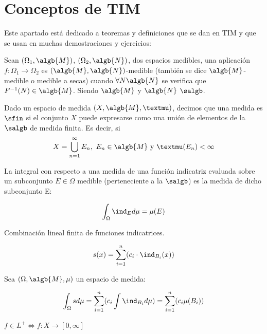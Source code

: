 \documentclass{apuntes}
\begin{document}
\section{Conceptos de TIM}
Este apartado está dedicado a teoremas y definiciones que se dan en TIM y que se usan en muchas demostraciones y ejercicios:

\begin{defn}
Sean $(\Omega_1, \algb{M})$, $(\Omega_2, \algb{N})$, dos espacios medibles, una aplicación $f:\Omega_1 \rightarrow \Omega_2$ es $(\algb{M}, \algb{N})$-medible (también se dice $\algb{M}$-medible o medible a secas) cuando $\forall N \algb{N}$ se verifica que $F^{-1}(N) \in \algb{M}$. Siendo $\algb{M}$ y $\algb{N}$ $\salgb$.
\end{defn}

\begin{defn}\label{defSigmaFinita}
Dado un espacio de medida $(X, \algb{M}, µ)$, decimos que una medida es $\sfin$ si el conjunto $X$ puede expresarse como una unión de elementos de la $\salgb$ de medida finita. Es decir, si \[X=\bigcup_{n=1}^{\infty}E_n, \ E_n \in \algb{M} \text{ y }µ(E_n)< \infty\]
\end{defn}

\begin{defn}
La integral con respecto a una medida de una función indicatriz evaluada sobre un subconjunto $E \in \Omega$ medible (perteneciente a la $\salgb$) es la medida de dicho subconjunto E:

\[\int_{\Omega} \ind_{E}d\mu = \mu(E)\]
\end{defn}

\begin{defn}
Combinación lineal finita de funciones indicatrices.

\[
s(x) = \sum_{i=1}^{n}(c_i \cdot \ind_{B_i}(x))
\]
\end{defn}

\begin{defn}
Sea $(\Omega,\algb{M},\mu)$ un espacio de medida:

\[\int_{\Omega} sd\mu = \sum_{i=1}^{n}(c_i \int \ind_{B_i} d\mu) = \sum_{i=1}^{n}(c_i \mu(B_i))\]
\end{defn}

\begin{defn}[Función $L^+$]
$f \in L^+ \Leftrightarrow f:X\rightarrow [0, \infty]$
\end{defn}
\end{document}
